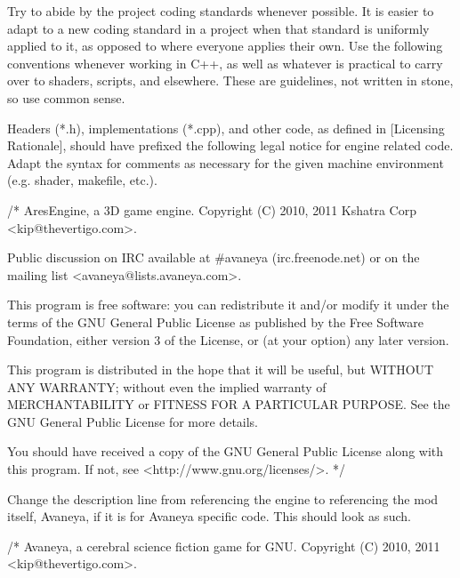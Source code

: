 

Try to abide by the project coding standards whenever possible. It is easier to adapt to a new coding standard in a project when that standard is uniformly applied to it, as opposed to where everyone applies their own. Use the following conventions whenever working in C++, as well as whatever is practical to carry over to shaders, scripts, and elsewhere. These are guidelines, not written in stone, so use common sense.

Headers (*.h), implementations (*.cpp), and other code, as defined in [Licensing Rationale], should have prefixed the following legal notice for engine related code. Adapt the syntax for comments as necessary for the given machine environment (e.g. shader, makefile, etc.).

\StartCodeExample
\starttyping
/*
    AresEngine, a 3D game engine.
    Copyright (C) 2010, 2011 Kshatra Corp <kip@thevertigo.com>.

    Public discussion on IRC available at #avaneya (irc.freenode.net)
    or on the mailing list <avaneya@lists.avaneya.com>.

    This program is free software: you can redistribute it and/or modify
    it under the terms of the GNU General Public License as published by
    the Free Software Foundation, either version 3 of the License, or
    (at your option) any later version.

    This program is distributed in the hope that it will be useful,
    but WITHOUT ANY WARRANTY; without even the implied warranty of
    MERCHANTABILITY or FITNESS FOR A PARTICULAR PURPOSE.  See the
    GNU General Public License for more details.

    You should have received a copy of the GNU General Public License
    along with this program.  If not, see <http://www.gnu.org/licenses/>.
*/
\stoptyping
\StopCodeExample

Change the description line from referencing the engine to referencing the mod itself, Avaneya, if it is for Avaneya specific code. This should look as such.

\StartCodeExample
\starttyping
/*
    Avaneya, a cerebral science fiction game for GNU.
    Copyright (C) 2010, 2011 <kip@thevertigo.com>.

